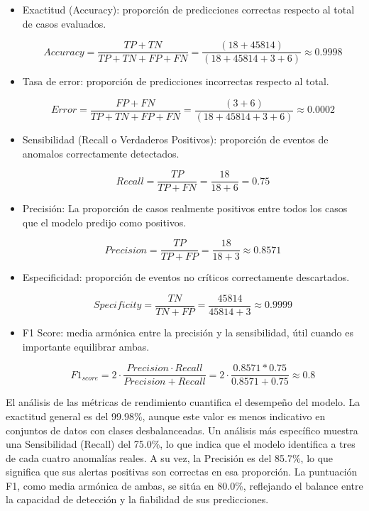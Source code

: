\begin{itemize}
      \item  Exactitud (Accuracy): proporción de predicciones correctas respecto al total de casos evaluados.

            $$Accuracy = \frac{TP+TN}{TP+TN+FP+FN}=\frac{(18+45814)}{(18+45814+3+6)}\approx 0.9998$$

      \item Tasa de error: proporción de predicciones incorrectas respecto al total.

            $$Error = \frac{FP+FN}{TP+TN+FP+FN}=\frac{(3+6)}{(18+45814+3+6)}\approx 0.0002$$

      \item Sensibilidad (Recall o Verdaderos Positivos): proporción de eventos de anomalos correctamente detectados.

            $$Recall = \frac{TP}{TP+FN}=\frac{18}{18+6}=0.75$$

      \item Precisión: La proporción de casos realmente positivos entre todos los casos que el modelo predijo como positivos.

            $$Precision = \frac{TP}{TP+FP}=\frac{18}{18+3}\approx 0.8571$$

      \item Especificidad: proporción de eventos no críticos correctamente descartados.

            $$Specificity = \frac{TN}{TN+FP}=\frac{45814}{45814+3}\approx 0.9999$$

      \item F1 Score: media armónica entre la precisión y la sensibilidad, útil cuando es importante equilibrar ambas.

            $$F1_{score} = 2 \cdot \frac{Precision \cdot Recall}{Precision + Recall} = 2 \cdot \frac{0.8571 * 0.75}{0.8571+0.75} \approx 0.8$$
\end{itemize}

El análisis de las métricas de rendimiento cuantifica el desempeño del modelo. La exactitud general es del 99.98\%, aunque este valor es menos indicativo en conjuntos de datos con clases desbalanceadas. Un análisis más específico muestra una Sensibilidad (Recall) del 75.0\%, lo que indica que el modelo identifica a tres de cada cuatro anomalías reales. A su vez, la Precisión es del 85.7\%, lo que significa que sus alertas positivas son correctas en esa proporción. La puntuación F1, como media armónica de ambas, se sitúa en 80.0\%, reflejando el balance entre la capacidad de detección y la fiabilidad de sus predicciones.

